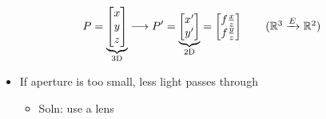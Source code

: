 \documentclass[letterpaper,12pt]{article}
\newcommand{\lra}{\ensuremath{\longrightarrow{}}}
\begin{document}
\begin{align}
 P = \underbrace{\begin{bmatrix}
   x \\
   y \\
   z
  \end{bmatrix}}_\text{3D}
 \lra
 P' = \underbrace{\begin{bmatrix}
   x' \\
   y'
  \end{bmatrix}}_\text{2D}
 =\begin{bmatrix}
  f \frac{x}{z} \\
  f \frac{y}{z}
 \end{bmatrix}\tag{$\mathbb{R}^3 \xrightarrow{E} \mathbb{R}^2$}
\end{align}
\begin{itemize}
 \item If aperture is too small, less light passes through
       \begin{itemize}
        \item Soln: use a lens
       \end{itemize}
\end{itemize}
\end{document}
